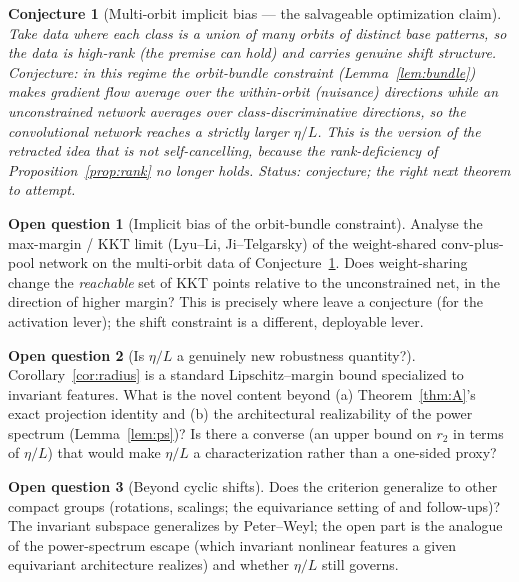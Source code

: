 \documentclass[11pt]{article}
\theoremstyle{plain}
\newtheorem{conjecture}{Conjecture}
\theoremstyle{definition}
\newtheorem{question}{Open question}
\theoremstyle{remark}
\begin{document}
\begin{conjecture}[Multi-orbit implicit bias --- the salvageable optimization claim]\label{dir:multiorbit}
Take data where each class is a union of \emph{many} orbits of \emph{distinct} base patterns, so the data is high-rank (the \citet{frei2023double,li2025feature} premise can hold) \emph{and} carries genuine shift structure. Conjecture: in this regime the orbit-bundle constraint (Lemma~\ref{lem:bundle}) makes gradient flow average over the within-orbit (nuisance) directions while an unconstrained network averages over class-discriminative directions, so the convolutional network reaches a strictly larger $\eta/L$. This is the version of the retracted idea that is not self-cancelling, because the rank-deficiency of Proposition~\ref{prop:rank} no longer holds. \emph{Status: conjecture; the right next theorem to attempt.}
\end{conjecture}

\begin{question}[Implicit bias of the orbit-bundle constraint]
Analyse the max-margin / KKT limit (Lyu--Li, Ji--Telgarsky) of the weight-shared conv-plus-pool network on the multi-orbit data of Conjecture~\ref{dir:multiorbit}. Does weight-sharing change the \emph{reachable} set of KKT points relative to the unconstrained net, in the direction of higher margin? This is precisely where \citet{min2024can} leave a conjecture (for the activation lever); the shift constraint is a different, deployable lever.
\end{question}

\begin{question}[Is $\eta/L$ a genuinely new robustness quantity?]
Corollary~\ref{cor:radius} is a standard Lipschitz--margin bound specialized to invariant features. What is the novel content beyond (a) Theorem~\ref{thm:A}'s exact projection identity and (b) the architectural realizability of the power spectrum (Lemma~\ref{lem:ps})? Is there a converse (an upper bound on $r_2$ in terms of $\eta/L$) that would make $\eta/L$ a characterization rather than a one-sided proxy?
\end{question}

\begin{question}[Beyond cyclic shifts]
Does the criterion generalize to other compact groups (rotations, scalings; the equivariance setting of \citet{kamath2021canwehaveitall} and follow-ups)? The invariant subspace generalizes by Peter--Weyl; the open part is the analogue of the power-spectrum escape (which invariant nonlinear features a given equivariant architecture realizes) and whether $\eta/L$ still governs.
\end{question}
\end{document}
